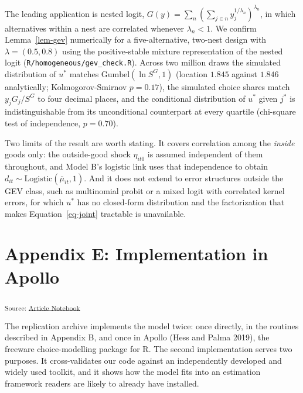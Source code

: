 \documentclass[
  letterpaper,
  DIV=11,
  numbers=noendperiod]{scrartcl}
\theoremstyle{plain}
\theoremstyle{plain}
\theoremstyle{remark}
\begin{document}
The leading application is nested logit,
\(G(y) = \sum_{n} \left( \sum_{j \in n} y_j^{1/\lambda_n} \right)^{\lambda_n}\),
in which alternatives within a nest are correlated whenever
\(\lambda_n < 1\). We confirm Lemma~\ref{lem-gev} numerically for a
five-alternative, two-nest design with \(\lambda = (0.5, 0.8)\) using
the positive-stable mixture representation of the nested logit
(\texttt{R/homogeneous/gev\_check.R}). Across two million draws the
simulated distribution of \(u^*\) matches
\(\text{Gumbel}(\ln S^{G}, 1)\) (location \(1.845\) against \(1.846\)
analytically; Kolmogorov-Smirnov \(p = 0.17\)), the simulated choice
shares match \(y_j G_j / S^{G}\) to four decimal places, and the
conditional distribution of \(u^*\) given \(j^*\) is indistinguishable
from its unconditional counterpart at every quartile (chi-square test of
independence, \(p = 0.70\)).

Two limits of the result are worth stating. It covers correlation among
the \emph{inside} goods only: the outside-good shock \(\eta_{it0}\) is
assumed independent of them throughout, and Model B's logistic link uses
that independence to obtain
\(d_{it} \sim \text{Logistic}(\overline{\mu}_{it}, 1)\). And it does not
extend to error structures outside the GEV class, such as multinomial
probit or a mixed logit with correlated kernel errors, for which \(u^*\)
has no closed-form distribution and the factorization that makes
Equation~\ref{eq-joint} tractable is unavailable.

\section*{Appendix E: Implementation in
Apollo}\label{sec-appendix-apollo}

\textsubscript{Source:
\href{https://dyavorsky.github.io/ordinalDualresponse_paper/index.qmd.html}{Article
Notebook}}

The replication archive implements the model twice: once directly, in
the routines described in Appendix B, and once in Apollo (Hess and Palma
2019), the freeware choice-modelling package for R. The second
implementation serves two purposes. It cross-validates our code against
an independently developed and widely used toolkit, and it shows how the
model fits into an estimation framework readers are likely to already
have installed.
\end{document}
